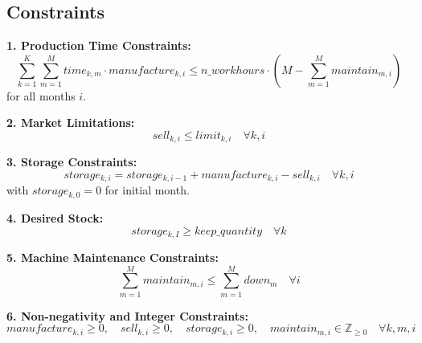 \documentclass{article}
\begin{document}
\subsection*{Constraints}

\textbf{1. Production Time Constraints:}
\[
\sum_{k=1}^{K} \sum_{m=1}^{M} time_{k,m} \cdot manufacture_{k,i} \leq n\_workhours \cdot (M - \sum_{m=1}^{M} maintain_{m,i})
\]
for all months $i$.

\textbf{2. Market Limitations:}
\[
sell_{k,i} \leq limit_{k,i} \quad \forall k, i
\]

\textbf{3. Storage Constraints:}
\[
storage_{k,i} = storage_{k,i-1} + manufacture_{k,i} - sell_{k,i} \quad \forall k, i
\]
with $storage_{k,0} = 0$ for initial month.

\textbf{4. Desired Stock:}
\[
storage_{k,I} \geq keep\_quantity \quad \forall k
\]

\textbf{5. Machine Maintenance Constraints:}
\[
\sum_{m=1}^{M} maintain_{m,i} \leq \sum_{m=1}^{M} down_m \quad \forall i
\]

\textbf{6. Non-negativity and Integer Constraints:}
\[
manufacture_{k,i} \geq 0, \quad sell_{k,i} \geq 0, \quad storage_{k,i} \geq 0, \quad maintain_{m,i} \in \mathbb{Z}_{\geq 0} \quad \forall k, m, i
\]
\end{document}
